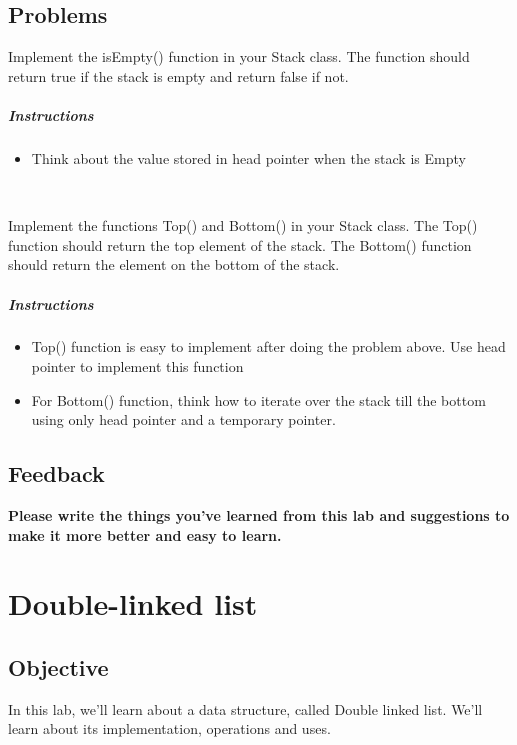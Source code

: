 \documentclass[11pt,fleqn]{book} %
\begin{document}
 \section{Problems}
 \begin{problem}
 	Implement the isEmpty() function in your Stack class. The function should return true if the stack is empty and return false if not.
 	\paragraph{Instructions}
 	\begin{itemize}
 		\item Think about the value stored in head pointer when the stack is Empty
 	\end{itemize}
 \end{problem}
~\\
\begin{problem}
	Implement the  functions Top() and Bottom() in your Stack class. The Top() function should return the top element of the stack. The Bottom() function should return the element on the bottom of the stack.
	\paragraph{Instructions}
		\begin{itemize}
			\item Top() function is easy to implement after doing the problem above. Use head pointer to implement this function
			\item For Bottom() function, think how to iterate over the stack till the bottom using only head pointer and a temporary pointer.
		\end{itemize}
\end{problem}
\newpage


\section{Feedback}
\textbf{Please write the things you've learned from this lab and suggestions to make it more better and easy to learn.}

\chapter{Double-linked list}
\section{Objective}
In this lab, we'll learn about a data structure, called Double linked list. We'll learn about its implementation, operations and uses.
\end{document}
